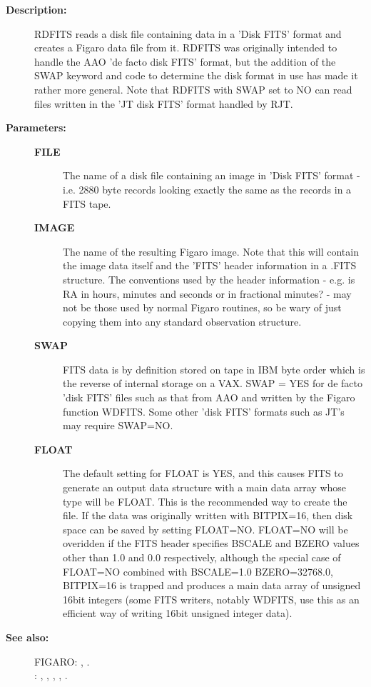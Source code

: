 \begin{description}
\begin{description}
\item [\textbf{Description:}]
 RDFITS reads a disk file containing data in a 'Disk FITS' format
 and creates a Figaro data file from it.  RDFITS was originally
 intended to handle the AAO 'de facto disk FITS' format, but the
 addition of the SWAP keyword and code to determine the disk
 format in use has made it rather more general.  Note that RDFITS
 with SWAP set to NO can read files written in the 'JT disk FITS'
 format handled by RJT.

\item [\textbf{Parameters:}]
\begin{description}
\item [\textbf{FILE}]
 The name of a disk file containing an image
 in 'Disk FITS' format - i.e. 2880 byte records looking
 exactly the same as the records in a FITS tape.
\item [\textbf{IMAGE}]
 The name of the resulting Figaro image.  Note that
 this will contain the image data itself and the 'FITS'
 header information in a .FITS structure.  The conventions
 used by the header information - e.g. is RA in hours, minutes
 and seconds or in fractional minutes? - may not be those
 used by normal Figaro routines, so be wary of just copying
 them into any standard observation structure.
\item [\textbf{SWAP}]
 FITS data is by definition stored on tape in IBM byte order
 which is the reverse of internal storage on a VAX.  SWAP =
 YES for de facto 'disk FITS' files such as that from AAO
 and written by the Figaro function WDFITS.  Some other 'disk
 FITS' formats such as JT's may require SWAP=NO.
\item [\textbf{FLOAT}]
 The default setting for FLOAT is YES, and this causes
 FITS to generate an output data structure with a main
 data array whose type will be FLOAT.  This is the
 recommended way to create the file.  If the data was
 originally written with BITPIX=16, then disk space can
 be saved by setting FLOAT=NO.  FLOAT=NO will be overidden
 if the FITS header specifies BSCALE and BZERO values other
 than 1.0 and 0.0 respectively, although the special case
 of FLOAT=NO combined with BSCALE=1.0 BZERO=32768.0,
 BITPIX=16 is trapped and produces a main data array of
 unsigned 16bit integers (some FITS writers, notably WDFITS,
 use this as an efficient way of writing 16bit unsigned
 integer data).
\end{description}

\item [\textbf{See also:}]
FIGARO: , .\\
: , , , , .\\


\end{description}
\end{description}

